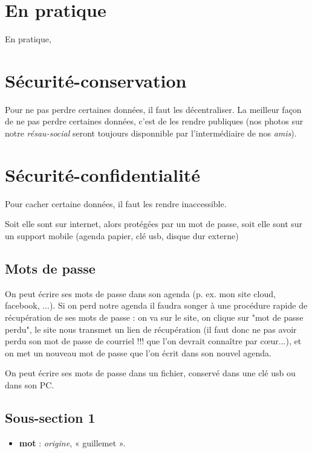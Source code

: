 
\section{En pratique}

En pratique, 





\section{Sécurité-conservation}

Pour ne pas perdre certaines données, il faut les décentraliser. La meilleur façon de ne pas perdre certaines données, c'est de les rendre publiques (nos photos sur notre {\it résau-social} seront toujours disponnible par l'intermédiaire de nos {\it amis}).

\section{Sécurité-confidentialité}

Pour cacher certaine données, il faut les rendre inaccessible.

Soit elle sont sur internet, alors protégées par un mot de passe, soit elle sont sur un support mobile (agenda papier, clé usb, disque dur externe)



\subsection{Mots de passe}

On peut écrire ses mots de passe dans son agenda (p. ex. mon site cloud, facebook, ...). Si on perd notre agenda il faudra songer à une procédure rapide de récupération de ses mots de passe : on va sur le site, on clique sur "mot de passe perdu", le site nous transmet un lien de récupération (il faut donc ne pas avoir perdu son mot de passe de courriel !!! que l'on devrait connaître par c{\oe}ur...), et on met un nouveau mot de passe que l'on écrit dans son nouvel agenda.

On peut écrire ses mots de passe dans un fichier, conservé dans une clé usb ou dans son PC.


\subsection{Sous-section 1} \label{labelLivre1}

\begin{itemize}[leftmargin=1cm, label=, itemsep=1pt]
\item {\footnotesize \bf mot} : {\it origine}, « guillemet ».
\end{itemize}


